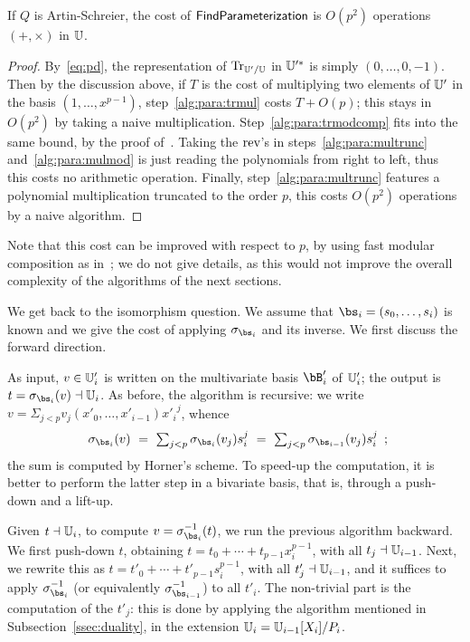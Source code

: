 \begin{proposition}
  \label{th:findparameterization}
  If $Q$ is Artin-Schreier, the cost of ${\sf FindParameterization}$ is
  $O(p^2)$ operations $(+,\times)$ in $\mathbb{U}$.
\end{proposition}
\begin{proof} By~\ref{eq:pd}, the representation of $\operatorname{Tr}_{\mathbb{U}'/\mathbb{U}}$ in
$\mathbb{U}'^\ast$ is simply $(0,\ldots,0,-1)$. Then by the discussion above,
if $T$ is the cost of multiplying two elements of $\mathbb{U}'$ in the basis
$(1,\ldots,x^{p-1})$, step~\ref{alg:para:trmul} costs $T + O(p)$; this
stays in $O(p^2)$ by taking a naive
multiplication. Step~\ref{alg:para:trmodcomp} fits into the same
bound, by the proof of~\cite[Th.~4]{Sho94}. Taking the $\operatorname{rev}$'s in
steps~\ref{alg:para:multrunc} and~\ref{alg:para:mulmod} is just
reading the polynomials from right to left, thus this costs no
arithmetic operation. Finally, step~\ref{alg:para:multrunc} features a
polynomial multiplication truncated to the order $p$, this costs
$O(p^2)$ operations by a naive algorithm.\end{proof}

Note that this cost can be improved with respect to $p$, by using fast
modular composition as in~\cite{Sho94}; we do not give details, as this
would not improve the overall complexity of the algorithms of the next
sections.


We get back to the isomorphism question. We assume that
$\bs_i=(s_0,\dots,s_i)$ is known and we give the cost of applying
$\sigma_{\bs_i}$ and its inverse.  We first discuss the forward
direction.

As input, $v \in \mathbb{U}'_i$ is written on the multivariate basis $\bB'_i$
of $\mathbb{U}'_i$; the output is $t=\sigma_{\bs_i}(v) \wrt \U_i$. As before,
the algorithm is recursive: we write $v=\Sigma_{j <p}
v_j(x'_0,\dots,x'_{i-1}) {x'_i}^j$, whence
$$\begin{array}{c}\sigma_{\bs_i}(v)\ =\ \sum_{j
  <p} \sigma_{\bs_i}(v_j) s_i^j\ =\ \sum_{j
  <p} \sigma_{\bs_{i-1}}(v_j) s_i^j
\end{array}
;$$ the sum is computed by Horner's scheme.
To speed-up the computation, it is better to
perform the latter step in a bivariate basis, that is, through a
push-down and a lift-up.



Given $t \dashv \mathbb{U}_i$, to compute $v=\sigma_{\bs_i}^{-1}(t)$, we run the
previous algorithm backward. We first push-down $t$, obtaining $t=t_0
+ \cdots + t_{p-1}x_i^{p-1}$, with all $t_j \dashv \mathbb{U}_{i-1}$. Next, we
rewrite this as $t=t'_0+\cdots + t'_{p-1}s_i^{p-1}$, with all $t'_j
\dashv \mathbb{U}_{i-1}$, and it suffices to apply $\sigma_{\bs_i}^{-1}$ (or
equivalently $\sigma_{\bs_{i-1}}^{-1}$) to all $t'_i$. The non-trivial
part is the computation of the $t'_j$: this is done by applying the
algorithm  mentioned in
Subsection~\ref{ssec:duality}, in the extension $\mathbb{U}_i=
\mathbb{U}_{i-1}[X_i]/P_i$.



